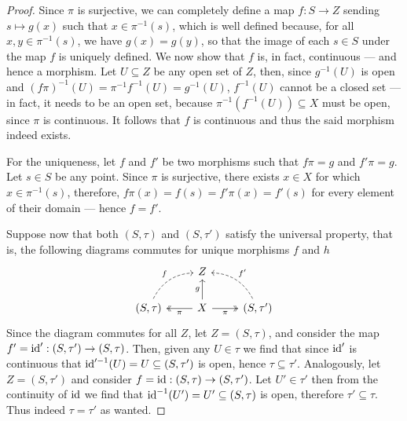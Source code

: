 \begin{proof}
Since \(\pi\) is surjective, we can completely define a map \(f: S \to Z\)
sending \(s \mapsto g(x)\) such that \(x \in \pi^{-1}(s)\), which is well
defined because, for all \(x, y \in \pi^{-1}(s)\), we have \(g(x) = g(y)\), so
that the image of each \(s \in S\) under the map \(f\) is uniquely defined. We
now show that \(f\) is, in fact, continuous --- and hence a morphism. Let
\(U \subseteq Z\) be any open set of \(Z\), then, since \(g^{-1}(U)\) is open
and \((f \pi)^{-1}(U) = \pi^{-1} f^{-1}(U) = g^{-1}(U)\), \(f^{-1}(U)\) cannot
be a closed set --- in fact, it needs to be an open set, because
\(\pi^{-1}(f^{-1}(U)) \subseteq X\) must be open, since \(\pi\) is continuous.
It follows that \(f\) is continuous and thus the said morphism indeed exists.

For the uniqueness, let \(f\) and \(f'\) be two morphisms such that \(f\pi = g\)
and \(f'\pi = g\). Let \(s \in S\) be any point. Since \(\pi\) is surjective,
there exists \(x \in X\) for which \(x \in \pi^{-1}(s)\), therefore,
\(f \pi(x) = f(s) = f'\pi(x) = f'(s)\) for every element of their domain ---
hence \(f = f'\).

Suppose now that both \((S, \tau)\) and \((S, \tau')\) satisfy the
universal property, that is, the following diagrams commutes for unique
morphisms \(f\) and \(h\)
\[
  \begin{tikzcd}
    &Z & \\
    (S, \tau) \ar[ur, dashed, bend left, "f"]
    &X \ar[l, two heads, "\pi"] \ar[r, swap, two heads, "\pi"] \ar[u, "g"]
    &(S, \tau') \ar[ul, dashed, bend right, swap, "f'"]
  \end{tikzcd}
\]
Since the diagram commutes for all \(Z\), let \(Z = (S, \tau)\), and
consider the map \(f' = \operatorname{id}': (S, \tau') \to (S, \tau)\). Then,
given any \(U \in \tau\) we find that since \(\operatorname{id}'\) is continuous that
\(\operatorname{id}'^{-1}(U) = U \subseteq (S, \tau')\) is open, hence
\(\tau \subseteq \tau'\). Analogously, let \(Z = (S, \tau')\)
and consider \(f = \operatorname{id}: (S, \tau) \to (S, \tau')\). Let
\(U' \in \tau'\) then from the continuity of \(\operatorname{id}\) we find that
\(\operatorname{id}^{-1}(U') = U' \subseteq (S, \tau)\) is open, therefore
\(\tau' \subseteq \tau\). Thus indeed \(\tau = \tau'\)
as wanted.
\end{proof}

